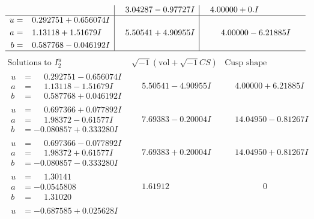 \documentclass[1p]{elsarticle_modified}
\theoremstyle{definition}
\newcommand{\I}{\sqrt{-1}}
\begin{document}
$$\begin{array}{c|c|c}
 & \phantom{-}3.04287 - 0.97727 I & \phantom{-}4.00000 + 0. I\phantom{ +0.000000I} \\ \hline\begin{aligned}
u &= \phantom{-}0.292751 + 0.656074 I \\
a &= \phantom{-}1.13118 + 1.51679 I \\
b &= \phantom{-}0.587768 - 0.046192 I\end{aligned}
 & \phantom{-}5.50541 + 4.90955 I & \phantom{-}4.00000 - 6.21885 I\\
 \hline 
 \end{array}$$\newpage$$\begin{array}{c|c|c}  
\text{Solutions to }I^u_{2}& \I (\text{vol} + \sqrt{-1}CS) & \text{Cusp shape}\\
 \hline 
\begin{aligned}
u &= \phantom{-}0.292751 - 0.656074 I \\
a &= \phantom{-}1.13118 - 1.51679 I \\
b &= \phantom{-}0.587768 + 0.046192 I\end{aligned}
 & \phantom{-}5.50541 - 4.90955 I & \phantom{-}4.00000 + 6.21885 I \\ \hline\begin{aligned}
u &= \phantom{-}0.697366 + 0.077892 I \\
a &= \phantom{-}1.98372 - 0.61577 I \\
b &= -0.080857 + 0.333280 I\end{aligned}
 & \phantom{-}7.69383 - 0.20004 I & \phantom{-}14.04950 - 0.81267 I \\ \hline\begin{aligned}
u &= \phantom{-}0.697366 - 0.077892 I \\
a &= \phantom{-}1.98372 + 0.61577 I \\
b &= -0.080857 - 0.333280 I\end{aligned}
 & \phantom{-}7.69383 + 0.20004 I & \phantom{-}14.04950 + 0.81267 I \\ \hline\begin{aligned}
u &= \phantom{-}1.30141\phantom{ +0.000000I} \\
a &= -0.0545808\phantom{ +0.000000I} \\
b &= \phantom{-}1.31020\phantom{ +0.000000I}\end{aligned}
 & \phantom{-}1.61912\phantom{ +0.000000I} & \phantom{-0.000000 } 0 \\ \hline\begin{aligned}
u &= -0.687585 + 0.025628 I \\

\end{aligned}
\end{array}$$
\end{document}
